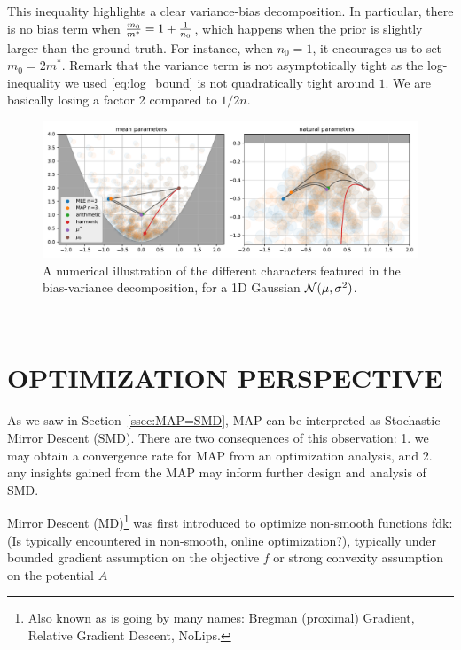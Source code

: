 \documentclass[twoside]{article}
\let\oldsection\section
\renewcommand{\section}[1]{\oldsection{\texorpdfstring{\uppercase{#1}}{#1}}}
\newcommand{\fdk}[1]{\textcolor{Periwinkle}{fdk:#1}}
\newcommand{\logpart}{A}
\newcommand{\m}{m}
\begin{document}
This inequality highlights a clear variance-bias decomposition.
In particular, there is no bias term when $\frac{\m_0}{\m^*} =1 + \inv{n_0} $, which happens when the prior is slightly larger than the ground truth.  For instance, when $n_0=1$, it encourages us to set $\m_0 = 2 \m^*$.
Remark that the variance term is not asymptotically tight as the log-inequality we used \eqref{eq:log_bound} is not quadratically tight around $1$. We are basically losing a factor 2 compared to $1/2n$.


\begin{figure}[t]
	\centering
	\includegraphics[width=\textwidth]{figs/thales/numerical_schema_n=3.pdf}
	\caption{A numerical illustration of the different characters featured in the bias-variance decomposition, for a 1D Gaussian ${\mathcal N}(\mu, \sigma^2)$.}
	\label{fig:bias-variance-numerical}
\end{figure}






\newpage~\null\\
\FloatBarrier

\section{Optimization Perspective}
\label{sec:optimization}
As we saw in Section~\ref{ssec:MAP=SMD}, MAP can be interpreted as Stochastic Mirror Descent (SMD).
There are two consequences of this observation: 1. we may obtain a convergence rate for MAP from an optimization analysis, and 2. any insights gained from the MAP may inform further design and analysis of SMD.

Mirror Descent (MD)\footnote{%
Also known as is going by many names:
Bregman (proximal) Gradient, Relative Gradient Descent, NoLips.
}
\citep{nemirovski1983problem}
was first introduced to optimize non-smooth functions \fdk{(Is typically encountered in non-smooth, online optimization?)},
typically under bounded gradient assumption on the objective $f$
or strong convexity assumption on the potential $\logpart$
\end{document}
